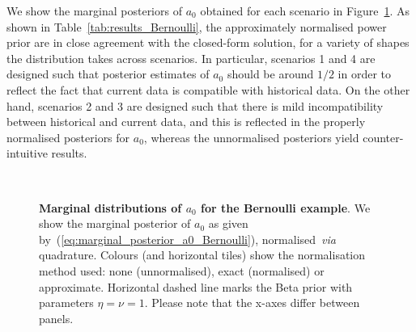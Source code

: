 \documentclass[a4paper, notitlepage, 11pt]{article}
\begin{document}
We show the marginal posteriors of $a_0$ obtained for each scenario in Figure~\ref{fig:marginal_a0_Bernoulli}.
As shown in Table~\ref{tab:results_Bernoulli}, the approximately normalised power prior are in close agreement with the closed-form solution, for a variety of shapes the distribution takes across scenarios.
In particular, scenarios 1 and 4 are designed such that posterior estimates of $a_0$ should be around $1/2$ in order to reflect the fact that current data is compatible with historical data.
On the other hand, scenarios 2 and 3 are designed such that there is mild incompatibility between historical and current data, and this is reflected in the properly normalised posteriors for $a_0$, whereas the unnormalised posteriors yield counter-intuitive results.

\begin{figure}[!ht]
\begin{center}
 \hfill
{}
\hfill
{}\\
\hfill
{}
\hfill
{}
\hfill
\end{center}
\caption{\textbf{Marginal distributions of $a_0$ for the Bernoulli example}.
We show the marginal posterior of $a_0$ as given by~(\ref{eq:marginal_posterior_a0_Bernoulli}), normalised~\textit{via} quadrature.
Colours (and horizontal tiles) show the normalisation method used: none (unnormalised), exact (normalised) or approximate.
Horizontal dashed line marks the Beta prior with parameters $\eta = \nu = 1$.
Please note that the x-axes differ between panels.
}
\label{fig:marginal_a0_Bernoulli}
\end{figure}
\end{document}
